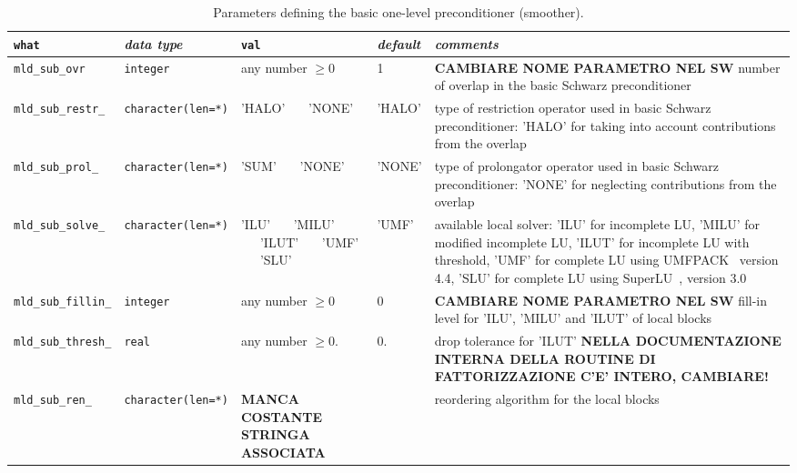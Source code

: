 \begin{sidewaystable}
\begin{center}
\begin{tabular}{|l|l|p{2cm}|l|p{7cm}|}
\hline
\verb|what|              & \emph{data type}        &  \verb|val|      &  \emph{default}  &
\emph{comments} \\ \hline
\verb|mld_sub_ovr|       & \verb|integer|
                         & any number $\ge 0$
                         & 1
                         & \textbf{CAMBIARE NOME PARAMETRO NEL SW} number of overlap in the basic Schwarz preconditioner   \\
\verb|mld_sub_restr_|    & \verb|character(len=*)|
                         & 'HALO' \ \ \ 'NONE'
                         & 'HALO'
                         & type of restriction operator used in basic Schwarz preconditioner: 'HALO' for taking into account contributions from the overlap \\
\verb|mld_sub_prol_|     & \verb|character(len=*)|
                         & 'SUM' \ \ \ 'NONE'
                         & 'NONE'
                         & type of prolongator operator used in basic Schwarz preconditioner: 'NONE' for neglecting contributions from the overlap    \\
\verb|mld_sub_solve_|    & \verb|character(len=*)|
                         & 'ILU' \ \ \ 'MILU' \ \ \ 'ILUT' \ \ \ 'UMF' \ \ \ 'SLU'
                         & 'UMF'
                         & available local solver: 'ILU' for incomplete LU, 'MILU' for modified incomplete LU, 'ILUT' 
for incomplete LU with threshold, 'UMF' for complete LU using UMFPACK~\cite{UMFPACK} version 4.4, 'SLU' for complete LU using SuperLU~\cite{SUPERLU}, version 3.0  \\    
\verb|mld_sub_fillin_|   & \verb|integer|
                         & any number $\ge 0$
                         & 0
                         & \textbf{CAMBIARE NOME PARAMETRO NEL SW} fill-in level for 'ILU', 'MILU' and 'ILUT' of local blocks\\
\verb|mld_sub_thresh_|   & \verb|real| 
                         & any number $\ge 0.$
                         & 0.
                         & drop tolerance for 'ILUT' 
\textbf{NELLA DOCUMENTAZIONE INTERNA DELLA ROUTINE DI FATTORIZZAZIONE C'E' INTERO, CAMBIARE!}\\
\verb|mld_sub_ren_|      & \verb|character(len=*)|
                         & \textbf{MANCA COSTANTE STRINGA ASSOCIATA}
                         &
                         & reordering algorithm for the local blocks \\
\hline

\end{tabular}
\end{center}
\caption{Parameters defining the basic one-level preconditioner (smoother).
\label{tab:p_smoother}}  
\end{sidewaystable}                     
                   
